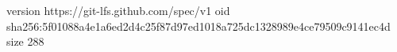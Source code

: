 version https://git-lfs.github.com/spec/v1
oid sha256:5f01088a4e1a6ed2d4c25f87d97ed1018a725dc1328989e4ce79509c9141ec4d
size 288
